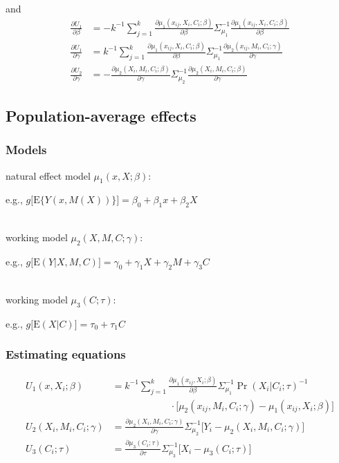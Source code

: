 \documentclass[]{article}
\begin{document}
\noindent and
\begin{align*}
\displaystyle \frac{\partial U_1}{\partial \beta} &= - k^{-1} \sum_{j=1}^{k} \frac{\partial \mu_1(x_{ij},X_i,C_i;\beta)}{\partial \beta} \Sigma_{\mu_1}^{-1} \frac{\partial \mu_1(x_{ij},X_i,C_i;\beta)}{\partial \beta}\\
\displaystyle \frac{\partial U_1}{\partial \gamma} &= k^{-1} \sum_{j=1}^{k} \frac{\partial \mu_1(x_{ij},X_i,C_i;\beta)}{\partial \beta} \Sigma_{\mu_1}^{-1} \frac{\partial \mu_2(x_{ij}, M_i,C_i;\gamma)}{\partial \gamma}\\
\displaystyle \frac{\partial U_2}{\partial \gamma} &= - \frac{\partial \mu_2(X_i,M_i,C_i;\beta)}{\partial \gamma} \Sigma_{\mu_2}^{-1} \frac{\partial \mu_2(X_i,M_i,C_i;\beta)}{\partial \gamma}
\end{align*}

\vspace{12pt}

\subsection*{Population-average effects}

\subsubsection*{Models}

natural effect model $\mu_1(x,X;\beta)$:
\begin{flushright} e.g., $g\big[\textrm{E}\{Y(x,M(X))\}\big] = \beta_0 + \beta_1 x + \beta_2 X$ \end{flushright}\\[1em]
working model $\mu_2(X,M,C;\gamma)$:
\begin{flushright} e.g., $g\big[\textrm{E}(Y\vert X,M,C)\big] = \gamma_0 + \gamma_1 X + \gamma_2 M + \gamma_3 C$ \end{flushright}\\[1em]
working model $\mu_3(C;\tau)$:
\begin{flushright} e.g., $g\big[\textrm{E}(X\vert C)\big] = \tau_0 + \tau_1 C$ \end{flushright}

\subsubsection*{Estimating equations}

\begin{align*}
\displaystyle U_{1}(x,X_i;\beta) &= k^{-1} \sum_{j=1}^{k} \frac{\partial \mu_1(x_{ij},X_i;\beta)}{\partial \beta} \Sigma_{\mu_1}^{-1} \Pr(X_i\vert C_i; \tau)^{-1} \\[-0.6em] & \qquad \qquad \qquad \cdot \big[ \mu_2(x_{ij},M_i,C_i;\gamma) - \mu_1(x_{ij},X_i;\beta) \big]\\[1em]
\displaystyle U_{2}(X_i,M_i,C_i;\gamma) &= \frac{\partial \mu_2(X_i,M_i,C_i;\gamma)}{\partial \gamma} \Sigma_{\mu_2}^{-1} \big[ Y_i - \mu_2(X_i,M_i,C_i;\gamma) \big]\\[1em]
\displaystyle U_{3}(C_i;\tau) &= \frac{\partial \mu_3(C_i;\tau)}{\partial \tau} \Sigma_{\mu_3}^{-1} \big[ X_i - \mu_3(C_i;\tau) \big]
\end{align*}
\end{document}
